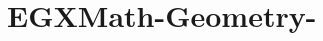 \hypertarget{group___e_g_x_math-_geometry-}{}\section{E\+G\+X\+Math-\/\+Geometry-\/}
\label{group___e_g_x_math-_geometry-}

